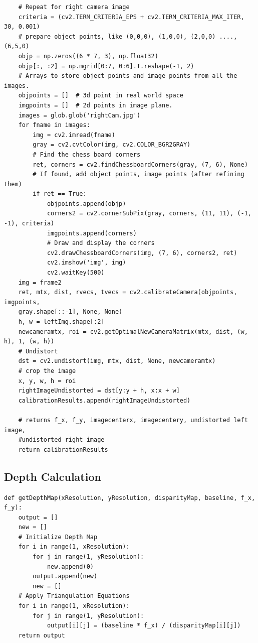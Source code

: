 \documentclass[11pt]{scrartcl}
\begin{document}
\begin{verbatim}
    # Repeat for right camera image
    criteria = (cv2.TERM_CRITERIA_EPS + cv2.TERM_CRITERIA_MAX_ITER, 30, 0.001)
    # prepare object points, like (0,0,0), (1,0,0), (2,0,0) ....,(6,5,0)
    objp = np.zeros((6 * 7, 3), np.float32)
    objp[:, :2] = np.mgrid[0:7, 0:6].T.reshape(-1, 2)
    # Arrays to store object points and image points from all the images.
    objpoints = []  # 3d point in real world space
    imgpoints = []  # 2d points in image plane.
    images = glob.glob('rightCam.jpg')
    for fname in images:
        img = cv2.imread(fname)
        gray = cv2.cvtColor(img, cv2.COLOR_BGR2GRAY)
        # Find the chess board corners
        ret, corners = cv2.findChessboardCorners(gray, (7, 6), None)
        # If found, add object points, image points (after refining them)
        if ret == True:
            objpoints.append(objp)
            corners2 = cv2.cornerSubPix(gray, corners, (11, 11), (-1, -1), criteria)
            imgpoints.append(corners)
            # Draw and display the corners
            cv2.drawChessboardCorners(img, (7, 6), corners2, ret)
            cv2.imshow('img', img)
            cv2.waitKey(500)
    img = frame2
    ret, mtx, dist, rvecs, tvecs = cv2.calibrateCamera(objpoints, imgpoints, 
    gray.shape[::-1], None, None)
    h, w = leftImg.shape[:2]
    newcameramtx, roi = cv2.getOptimalNewCameraMatrix(mtx, dist, (w, h), 1, (w, h))
    # Undistort
    dst = cv2.undistort(img, mtx, dist, None, newcameramtx)
    # crop the image
    x, y, w, h = roi
    rightImageUndistorted = dst[y:y + h, x:x + w]
    calibrationResults.append(rightImageUndistorted)

    # returns f_x, f_y, imagecenterx, imagecentery, undistorted left image, 
    #undistorted right image
    return calibrationResults
\end{verbatim}

\subsection{Depth Calculation}
\begin{verbatim}
def getDepthMap(xResolution, yResolution, disparityMap, baseline, f_x, f_y):
    output = []
    new = []
    # Initialize Depth Map
    for i in range(1, xResolution):
        for j in range(1, yResolution):
            new.append(0)
        output.append(new)
        new = []
    # Apply Triangulation Equations
    for i in range(1, xResolution):
        for j in range(1, yResolution):
            output[i][j] = (baseline * f_x) / (disparityMap[i][j])
    return output
\end{verbatim}
\newpage
\end{document}
